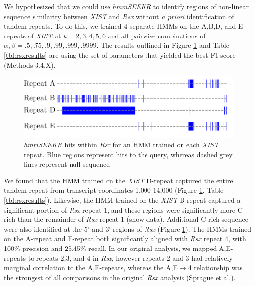 We hypothesized that we could use \emph{hmmSEEKR} to identify regions of non-linear sequence similarity between \emph{XIST} and \emph{Rsx} without \emph{a priori} identification of tandem repeats. To do this, we trained 4 separate HMMs on the A,B,D, and E-repeats of \emph{XIST} at $k=2,3,4,5,6$ and all pairwise combinations of $\alpha,\beta = .5,.75,.9,.99,.999,.9999$. The results outlined in Figure \ref{fig:koalarsxhmm} and Table \ref{tbl:rsxresults} are using the set of parameters that yielded the best F1 score (Methods 3.4.X). 


\begin{figure}[h!]
\centering
\includegraphics[width=\textwidth]{images/koalarsx.pdf}
\caption[HMM analysis of \emph{Rsx}]{\emph{hmmSEEKR} hits within \emph{Rsx} for an HMM trained on each \emph{XIST} repeat. Blue regions represent hits to the query, whereas dashed grey lines represent null sequence.}
\label{fig:koalarsxhmm}
\end{figure}

We found that the HMM trained on the \emph{XIST} D-repeat captured the entire tandem repeat from transcript coordinates 1,000-14,000 (Figure \ref{fig:koalarsxhmm}, Table \ref{tbl:rsxresults}). Likewise, the HMM trained on the \emph{XIST} B-repeat captured a significant portion of \emph{Rsx} repeat 1, and these regions were significantly more C-rich than the remainder of \emph{Rsx} repeat 1 (show data). Additional C-rich sequence were also identified at the 5' and 3' regions of \emph{Rsx} (Figure \ref{fig:koalarsxhmm}). The HMMs trained on the A-repeat and E-repeat both significantly aligned with \emph{Rsx} repeat 4, with 100\% precision and 25.45\% recall. In our original analysis, we mapped A,E-repeats to repeats 2,3, and 4 in \emph{Rsx}, however repeats 2 and 3 had relatively marginal correlation to the A,E-repeats, whereas the A,E$\rightarrow$4 relationship was the strongest of all comparisons in the original \emph{Rsx} analysis (Sprague et al.).

